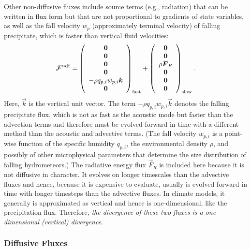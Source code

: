 \documentclass{article}
\begin{document}
Other non-diffusive fluxes include source terms (e.g., radiation) that can be written in flux form but that are not proportional to gradients of state variables, as well as the fall velocity $w_p$ (approximately terminal velocity) of falling precipitate, which is faster than vertical fluid velocities:
\begin{equation}
\boldsymbol{{\mathcal{F}}}^{\mathrm{ndf}} = 
\left( \begin{array}{c}
\boldsymbol{{0}} \\
\boldsymbol{{0}} \\
\boldsymbol{{0}} \\
\boldsymbol{{0}} \\
-\rho q_{p,i} w_{p, i} \boldsymbol{{k}} \\
\boldsymbol{{0}} 
\end{array}
\right)_{\mathrm{fast}} + 
\left( \begin{array}{c}
\boldsymbol{{0}} \\
\boldsymbol{{0}} \\
\rho \boldsymbol{{F}}_R\\
\boldsymbol{{0}} \\
\boldsymbol{{0}} \\
\boldsymbol{{0}} 
\end{array}
\right)_{\mathrm{slow}}.
\label{eq:ndf_flux}
\end{equation}
Here, $\vec{k}$ is the vertical unit vector.  The term $-\rho q_{p,i} w_{p, i} \vec{k}$ denotes the falling precipitate flux, which is not as fast as the acoustic mode but faster than the advection terms and therefore must be evolved forward in time with a different method than the acoustic and advective terms. (The fall velocity $w_{p, i}$ is a point-wise function of the specific humidity $q_{p,i}$, the environmental density $\rho$, and possibly of other microphysical parameters that determine the size distribution of falling hydrometeors.) The radiative energy flux $\vec{F}_R$ is included here because it is not diffusive in character. It evolves on longer timescales than the advective fluxes and hence, because it is expensive to evaluate, usually is evolved forward in time with longer timesteps than the advective fluxes. In climate models, it generally is approximated as vertical and hence is one-dimensional, like the precipitation flux. Therefore, \emph{the divergence of these two fluxes is a one-dimensional (vertical) divergence}.

\subsubsection{Diffusive Fluxes}
\end{document}
